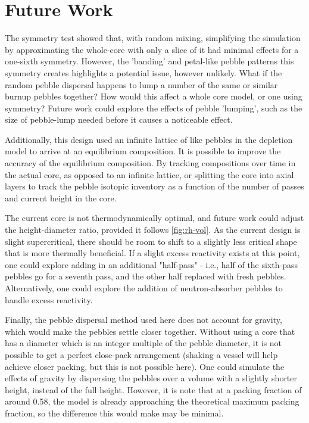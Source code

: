 \section{Future Work}

The symmetry test showed that, with random mixing, simplifying the simulation by approximating the whole-core with only a slice of it had minimal effects for a one-sixth symmetry.  However, the 'banding' and petal-like pebble patterns this symmetry creates highlights a potential issue, however unlikely.  What if the random pebble dispersal happens to lump a number of the same or similar burnup pebbles together?  How would this affect a whole core model, or one using symmetry?  Future work could explore the effects of pebble 'lumping', such as the size of pebble-lump needed before it causes a noticeable effect.

Additionally, this design used an infinite lattice of like pebbles in the depletion model to arrive at an equilibrium composition.  It is possible to improve the accuracy of the equilibrium composition.  By tracking compositions over time in the actual core, as opposed to an infinite lattice, or splitting the core into axial layers to track the pebble isotopic inventory as a function of the number of passes and current height in the core.

The current core is not thermodynamically optimal, and future work could adjust the height-diameter ratio, provided it follows \ref{fig:rh-vol}.  As the current design is slight supercritical, there should be room to shift to a slightly less critical shape that is more thermally beneficial.  If a slight excess reactivity exists at this point, one could explore adding in an additional "half-pass" - i.e., half of the sixth-pass pebbles go for a seventh pass, and the other half replaced with fresh pebbles.  Alternatively, one could explore the addition of neutron-absorber pebbles to handle excess reactivity.

Finally, the pebble dispersal method used here does not account for gravity, which would make the pebbles settle closer together.  Without using a core that has a diameter which is an integer multiple of the pebble diameter, it is not possible to get a perfect close-pack arrangement (shaking a vessel will help achieve closer packing, but this is not possible here).  One could simulate the effects of gravity by dispersing the pebbles over a volume with a slightly shorter height, instead of the full height.  However, it is note that at a packing fraction of around 0.58, the model is already approaching the theoretical maximum packing fraction, so the difference this would make may be minimal.